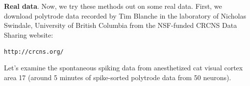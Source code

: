 \documentclass[letter, 12pt]{article}
\theoremstyle{definition}
\theoremstyle{remark}
\begin{document}
\textbf{Real data}.  Now, we try these methods out on some real data.  First, we download polytrode data recorded by Tim Blanche in the laboratory of Nicholas Swindale, University of British Columbia from the NSF-funded CRCNS Data Sharing website:

\begin{center}
\texttt{http://crcns.org/} \\
\end{center}

Let's examine the spontaneous spiking data from anesthetized cat visual cortex area 17 (around 5 minutes of spike-sorted polytrode data from 50 neurons).

\scriptsize
\setlength{\bibsep}{0pt plus 0.3ex}

 
\end{document}

